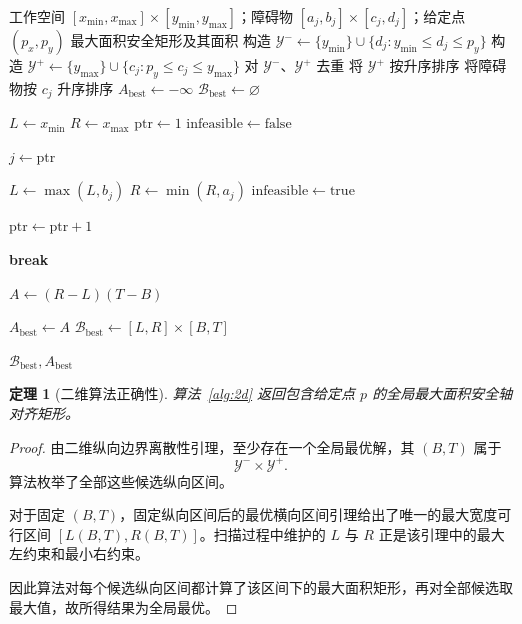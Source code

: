 \documentclass[UTF8,12pt,a4paper]{ctexart}
\newtheorem{theorem}{定理}
\begin{document}
\begin{algorithm}[htbp]
\caption{二维最大面积安全非对称矩形}
\label{alg:2d}
\footnotesize
\begin{algorithmic}[1]
\Require 工作空间 $[x_{\min},x_{\max}]\times[y_{\min},y_{\max}]$；障碍物 $[a_j,b_j]\times[c_j,d_j]$；给定点 $(p_x,p_y)$
\Ensure 最大面积安全矩形及其面积
\State 构造 $\mathcal Y^-\gets\{y_{\min}\}\cup\{d_j:y_{\min}\le d_j\le p_y\}$
\State 构造 $\mathcal Y^+\gets\{y_{\max}\}\cup\{c_j:p_y\le c_j\le y_{\max}\}$
\State 对 $\mathcal Y^-$、$\mathcal Y^+$ 去重
\State 将 $\mathcal Y^+$ 按升序排序
\State 将障碍物按 $c_j$ 升序排序
\State $A_{\mathrm{best}}\gets -\infty$
\State $\mathcal B_{\mathrm{best}}\gets\varnothing$

    \State $L\gets x_{\min}$
    \State $R\gets x_{\max}$
    \State $\mathrm{ptr}\gets 1$
    \State $\mathrm{infeasible}\gets\mathrm{false}$

            \State $j\gets\mathrm{ptr}$

                    \State $L\gets\max(L,b_j)$
                    \State $R\gets\min(R,a_j)$
                \Else
                    \State $\mathrm{infeasible}\gets\mathrm{true}$
                \EndIf
            \EndIf

            \State $\mathrm{ptr}\gets\mathrm{ptr}+1$
        \EndWhile

            \State \textbf{break}
        \EndIf

        \State $A\gets(R-L)(T-B)$

            \State $A_{\mathrm{best}}\gets A$
            \State $\mathcal B_{\mathrm{best}}\gets[L,R]\times[B,T]$
        \EndIf
    \EndFor
\EndFor

\State \Return $\mathcal B_{\mathrm{best}},A_{\mathrm{best}}$
\end{algorithmic}
\end{algorithm}

\begin{theorem}[二维算法正确性]
算法~\ref{alg:2d} 返回包含给定点 $p$ 的全局最大面积安全轴对齐矩形。
\end{theorem}

\begin{proof}
由二维纵向边界离散性引理，至少存在一个全局最优解，其 $(B,T)$ 属于
\[
\mathcal Y^-\times\mathcal Y^+.
\]
算法枚举了全部这些候选纵向区间。

对于固定 $(B,T)$，固定纵向区间后的最优横向区间引理给出了唯一的最大宽度可行区间 $[L(B,T),R(B,T)]$。扫描过程中维护的 $L$ 与 $R$ 正是该引理中的最大左约束和最小右约束。

因此算法对每个候选纵向区间都计算了该区间下的最大面积矩形，再对全部候选取最大值，故所得结果为全局最优。
\end{proof}
\end{document}
